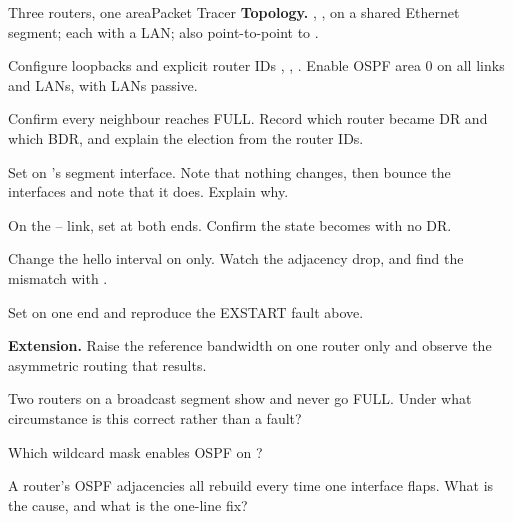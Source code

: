\begin{lab}{Three routers, one area}{Packet Tracer}
\textbf{Topology.} , ,  on a shared Ethernet segment;
each with a LAN;  also point-to-point to .

\begin{tasks}
  \item Configure loopbacks and explicit router IDs , ,
        . Enable OSPF area 0 on all links and LANs, with LANs
        passive.
  \item Confirm every neighbour reaches FULL. Record which router became DR and
        which BDR, and explain the election from the router IDs.
  \item Set  on 's segment interface. Note
        that nothing changes, then bounce the interfaces and note that it does.
        Explain why.
  \item On the -- link, set 
        at both ends. Confirm the state becomes  with no DR.
  \item Change the hello interval on  only. Watch the adjacency drop, and
        find the mismatch with .
  \item Set  on one end and reproduce the EXSTART fault above.
  \item \textbf{Extension.} Raise the reference bandwidth on one router only and
        observe the asymmetric routing that results.
\end{tasks}
\end{lab}

\begin{checkpoint}
\begin{tightnum}
  \item Two routers on a broadcast segment show  and never go FULL.
        Under what circumstance is this correct rather than a fault?
  \item Which wildcard mask enables OSPF on ?
  \item A router's OSPF adjacencies all rebuild every time one interface flaps.
        What is the cause, and what is the one-line fix?
\end{tightnum}
\end{checkpoint}

